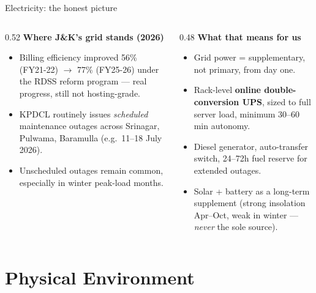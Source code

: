 \documentclass[aspectratio=169,10pt]{beamer}
\newcommand{\eyebrow}[1]{{\small\color{sovGold}\textbf{#1}}}
\begin{document}
\begin{frame}{Electricity: the honest picture}
  \begin{columns}[T]
    \begin{column}{0.52\textwidth}
      \eyebrow{Where J\&K's grid stands (2026)}
      \begin{itemize}
        \item Billing efficiency improved 56\% (FY21-22) $\rightarrow$ 77\% (FY25-26) under the RDSS reform program --- real progress, still not hosting-grade.
        \item KPDCL routinely issues \emph{scheduled} maintenance outages across Srinagar, Pulwama, Baramulla (e.g.\ 11--18 July 2026).
        \item Unscheduled outages remain common, especially in winter peak-load months.
      \end{itemize}
    \end{column}
    \begin{column}{0.48\textwidth}
      \eyebrow{What that means for us}
      \begin{itemize}
        \item Grid power = supplementary, not primary, from day one.
        \item Rack-level \textbf{online double-conversion UPS}, sized to full server load, minimum 30--60 min autonomy.
        \item Diesel generator, auto-transfer switch, 24--72h fuel reserve for extended outages.
        \item Solar + battery as a long-term supplement (strong insolation Apr--Oct, weak in winter --- \emph{never} the sole source).
      \end{itemize}
    \end{column}
  \end{columns}
\end{frame}

\section{Physical Environment}
\end{document}
